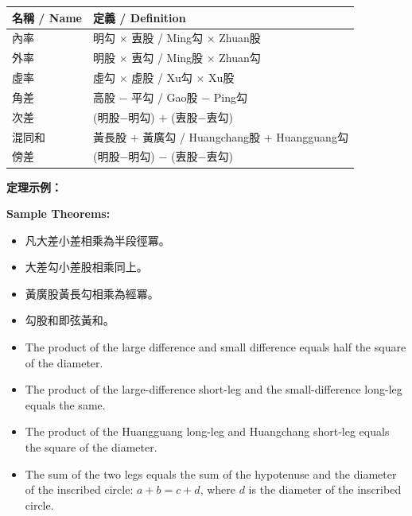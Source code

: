 \documentclass[11pt,a4paper]{article}
\newlength{\chwidth}
\newlength{\enwidth}
\newcommand{\zh}[1]{{\CJKfamily{sf}#1}}
\newenvironment{bilingual}{%
  \noindent
  \begin{minipage}[t]{\chwidth}%
  \small
}{%
  \end{minipage}%
}
\newcommand{\switchcolumn}{%
  \end{minipage}%
  \hfill%
  \begin{minipage}[t]{\enwidth}%
  \small
}
\newcommand{\bilingualpair}[2]{%
  \noindent
  \begin{minipage}[t]{\chwidth}%
  \small\zh{#1}%
  \end{minipage}%
  \hfill
  \begin{minipage}[t]{\enwidth}%
  \small #2%
  \end{minipage}%
  \par\vspace{0.3cm}
}
\begin{document}
\begin{center}
\small
\begin{tabular}{ll}
\toprule
\textbf{\zh{名稱}} / \textbf{Name} & \textbf{\zh{定義}} / \textbf{Definition} \\
\midrule
\zh{內率} & \zh{明勾 $\times$ 叀股} / Ming勾 $\times$ Zhuan股 \\
\zh{外率} & \zh{明股 $\times$ 叀勾} / Ming股 $\times$ Zhuan勾 \\
\zh{虛率} & \zh{虛勾 $\times$ 虛股} / Xu勾 $\times$ Xu股 \\
\zh{角差} & \zh{高股 $-$ 平勾} / Gao股 $-$ Ping勾 \\
\zh{次差} & \zh{(明股$-$明勾) $+$ (叀股$-$叀勾)} \\
\zh{混同和} & \zh{黃長股 $+$ 黃廣勾} / Huangchang股 + Huangguang勾 \\
\zh{傍差} & \zh{(明股$-$明勾) $-$ (叀股$-$叀勾)} \\
\bottomrule
\end{tabular}
\end{center}

\vspace{0.3cm}

\noindent\bilingualpair{\textbf{\zh{定理示例：}}}{\textbf{Sample Theorems:}}

\begin{bilingual}
\begin{itemize}[leftmargin=1.5em]
  \item \zh{凡大差小差相乘為半段徑冪。}
  \item \zh{大差勾小差股相乘同上。}
  \item \zh{黃廣股黃長勾相乘為經冪。}
  \item \zh{勾股和即弦黃和。}
\end{itemize}

\switchcolumn

\begin{itemize}[leftmargin=1.5em]
  \item The product of the large difference and small difference equals half the square of the diameter.
  \item The product of the large-difference short-leg and the small-difference long-leg equals the same.
  \item The product of the Huangguang long-leg and Huangchang short-leg equals the square of the diameter.
  \item The sum of the two legs equals the sum of the hypotenuse and the diameter of the inscribed circle: $a + b = c + d$, where $d$ is the diameter of the inscribed circle.
\end{itemize}
\end{bilingual}
\end{document}
